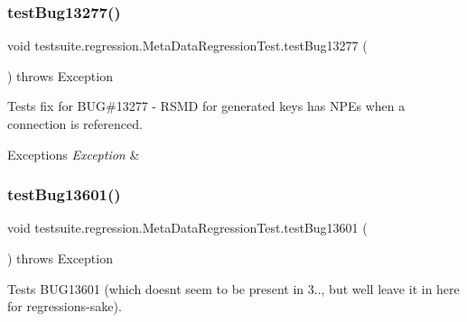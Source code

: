 \subsubsection{\texorpdfstring{test\+Bug13277()}{testBug13277()}}
{\footnotesize\ttfamily void testsuite.\+regression.\+Meta\+Data\+Regression\+Test.\+test\+Bug13277 (\begin{DoxyParamCaption}{ }\end{DoxyParamCaption}) throws Exception}

Tests fix for B\+UG\#13277 -\/ R\+S\+MD for generated keys has N\+P\+Es when a connection is referenced.


\begin{DoxyExceptions}{Exceptions}
{\em Exception} & \\
\hline
\end{DoxyExceptions}
\mbox{\label{classtestsuite_1_1regression_1_1_meta_data_regression_test_a9f064453a9a5087f0e60300320e2f041}} 
\subsubsection{\texorpdfstring{test\+Bug13601()}{testBug13601()}}
{\footnotesize\ttfamily void testsuite.\+regression.\+Meta\+Data\+Regression\+Test.\+test\+Bug13601 (\begin{DoxyParamCaption}{ }\end{DoxyParamCaption}) throws Exception}

Tests B\+U\+G13601 (which doesn\textquotesingle{}t seem to be present in 3.., but we\textquotesingle{}ll leave it in here for regression\textquotesingle{}s-\/sake).



